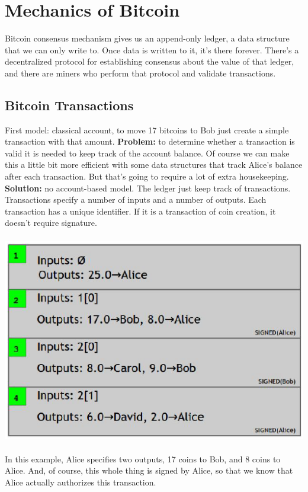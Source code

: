 \documentclass{article}
\begin{document}
\section{Mechanics of Bitcoin}
Bitcoin consensus mechanism gives us an append-only
ledger, a data structure that we can only write to. Once data is written to it, it’s there forever. There’s a decentralized protocol for establishing consensus about the value of that ledger, and there are miners who perform that protocol and validate transactions.
\subsection{Bitcoin Transactions}
First model: classical account, to move 17 bitcoins to Bob just create a simple transaction with that amount. \textbf{Problem: }to determine whether a transaction is valid it is needed to keep track of the account balance. Of course we can make this a little bit more efficient with some data structures that track Alice’s balance after each transaction. But that’s going to require a lot of extra housekeeping. \textbf{Solution: }no account-based model. The ledger just keep track of transactions. Transactions specify a number of inputs and a number of outputs. Each transaction has a unique identifier. If it is a transaction of coin creation, it doesn't require signature. \\\\
\includegraphics[scale=0.6]{18.png}\\\\
In this example, Alice specifies two outputs, 17 coins to Bob, and 8 coins to Alice. And, of course, this whole thing is signed by Alice, so that we know that Alice actually authorizes this transaction.\\
\end{document}
